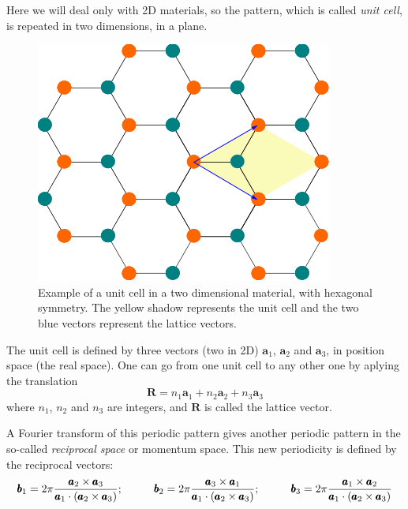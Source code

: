 \documentclass[a4paper,12pt]{report}
\begin{document}
Here we will deal only with 2D materials, so the pattern, which is called \emph{unit cell},
is repeated in two dimensions, in a plane.

\begin{figure}
 \centering
 \includegraphics[scale=0.5,keepaspectratio=true]{figures/unitcell_honeycomb.png}
 \caption{Example of a unit cell in a two dimensional material, with hexagonal symmetry.
 The yellow shadow represents the unit cell and the two blue vectors represent the lattice vectors.}
 \label{fig:unitcell}
\end{figure}

The unit cell is defined by three vectors (two in 2D) $\pmb{a}_1$, $\pmb{a}_2$ and $\pmb{a}_3$,
in position space (the real space).
One can go from one unit cell to any other one by aplying the translation
\begin{equation}
 \pmb{R} = n_1\pmb{a}_1 + n_2\pmb{a}_2 + n_3\pmb{a}_3
\end{equation}
where $n_1$, $n_2$ and $n_3$ are integers, and $\pmb{R}$ is called the lattice vector.

A Fourier transform of this periodic pattern gives another periodic pattern in the so-called
\emph{reciprocal space} or momentum space.
This new periodicity is defined by the reciprocal vectors:
\begin{equation*}
 \pmb{b}_1 = 2\pi\dfrac{\pmb{a}_2\times\pmb{a}_3}{\pmb{a}_1\cdot (\pmb{a}_2\times\pmb{a}_3)};\hspace*{1cm}
 \pmb{b}_2 = 2\pi\dfrac{\pmb{a}_3\times\pmb{a}_1}{\pmb{a}_1\cdot (\pmb{a}_2\times\pmb{a}_3)};\hspace*{1cm}
 \pmb{b}_3 = 2\pi\dfrac{\pmb{a}_1\times\pmb{a}_2}{\pmb{a}_1\cdot (\pmb{a}_2\times\pmb{a}_3)}
\end{equation*}
\end{document}
